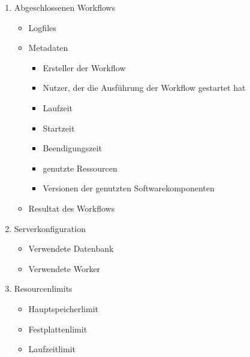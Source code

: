 \begin{enumerate}
    \item Abgeschlossenen \glspl{Workflow}
    \begin{itemize}
        \setlength\itemsep{-1em}
        \item Logfiles
        \item Metadaten
        \begin{itemize}
            \setlength\itemsep{-1em}
            \item Ersteller der \gls{Workflow}
            \item Nutzer, der die Ausführung der \gls{Workflow} gestartet hat
            \item Laufzeit
            \item Startzeit
            \item Beendigungszeit
            \item genutzte Ressourcen
            \item Versionen der genutzten Softwarekomponenten
        \end{itemize}
        \item Resultat des Workflows
    \end{itemize}
    \newpage
    \item Serverkonfiguration
    \begin{itemize}
        \setlength\itemsep{-1em}
        \item Verwendete Datenbank
        \item Verwendete Worker
    \end{itemize}
    
    \item Resourcenlimits
    \begin{itemize}
        \setlength\itemsep{-1em}
        \item Hauptspeicherlimit
        \item Festplattenlimit
        \item Laufzeitlimit
    \end{itemize}
 \end{enumerate}